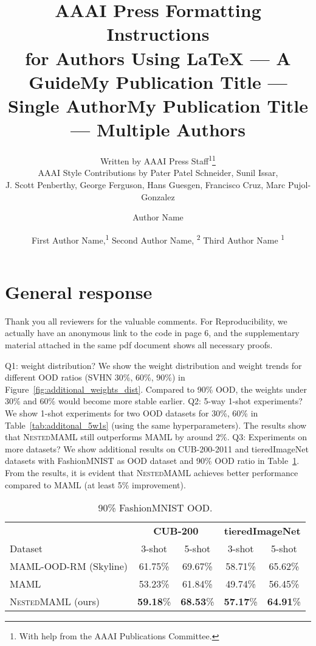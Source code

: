 \documentclass[letterpaper]{article} %
\title{AAAI Press Formatting Instructions \\for Authors Using \LaTeX{} --- A Guide}
\author{
    Written by AAAI Press Staff\textsuperscript{\rm 1}\thanks{With help from the AAAI Publications Committee.}\\
    AAAI Style Contributions by Pater Patel Schneider,
    Sunil Issar,\\
    J. Scott Penberthy,
    George Ferguson,
    Hans Guesgen,
    Francisco Cruz\equalcontrib,
    Marc Pujol-Gonzalez\equalcontrib
}
\title{My Publication Title --- Single Author}
\author {
    Author Name
}
\title{My Publication Title --- Multiple Authors}
\author {
    First Author Name,\textsuperscript{\rm 1}
    Second Author Name, \textsuperscript{\rm 2}
    Third Author Name \textsuperscript{\rm 1}
}
\newcommand{\sysname}{\textsc{NestedMAML}}
\begin{document}
\section{General response}
Thank you all reviewers for the valuable comments. For Reproducibility, we actually have an anonymous link to the code in page 6, and the supplementary material attached in the same pdf document shows all necessary proofs.

{\color{blue} {\noindent}Q1: weight distribution? }
We show the weight distribution and weight trends for different OOD ratios (SVHN 30\%, 60\%, 90\%) in Figure~\ref{fig:additional_weights_dist}. Compared to 90\% OOD, the weights under 30\% and 60\% would become more stable earlier. {\color{blue}{\noindent}Q2: 5-way 1-shot experiments? } We show 1-shot experiments for two OOD datasets for 30\%, 60\% in Table~\ref{tab:additonal_5w1s} (using the same hyperparameters). The results show that \sysname{} still outperforms MAML by around 2\%. {\color{blue}{\noindent}Q3: Experiments on more datasets? }We show additional results on CUB-200-2011 and tieredImageNet datasets with FashionMNIST as OOD dataset and 90\% OOD ratio in Table~\ref{tab:additonal}. From the results, it is evident that \sysname{} achieves better performance compared to MAML (at least 5\% improvement).

\begin{table}[t!]
    \tiny  
    \centering
    \begin{center}
    \vspace{-3mm}
    \begin{tabular}{l | c c |c c }
        \toprule
         & \multicolumn{2}{c|}{\textbf{CUB-200}} & \multicolumn{2}{c}{\textbf{tieredImageNet}}\\
        Dataset  & 3-shot & 5-shot  & 3-shot & 5-shot  \\
        \midrule
        MAML-OOD-RM (Skyline) & 61.75\% & 69.67\% & 58.71\%  & 65.62\% \\
        \midrule
        MAML              & 53.23\% & 61.84\% & 49.74\%  & 56.45\%  \\
        \hline
        \sysname{} (ours) & \textbf{59.18}\% & \textbf{68.53}\% & \textbf{57.17}\%  & \textbf{64.91}\% \\
        \bottomrule 
    \end{tabular}
\vspace{-3mm}
\end{center}
\vspace{-1mm}
\caption{\small 90\% FashionMNIST OOD.}
\label{tab:additonal}
\end{table}
\end{document}
